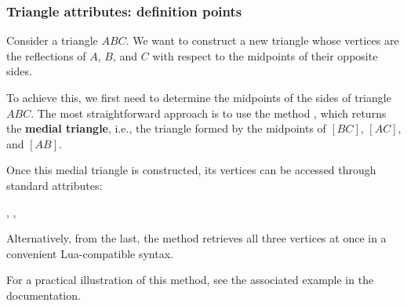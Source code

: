 \subsubsection{Triangle attributes: definition points} %
\label{ssub:triangle_attributes_points}

Consider a triangle $ABC$. We want to construct a new triangle whose vertices are the reflections of $A$, $B$, and $C$ with respect to the midpoints of their opposite sides.

\medskip
\noindent
To achieve this, we first need to determine the midpoints of the sides of triangle $ABC$. The most straightforward approach is to use the method , which returns the \textbf{medial triangle}, i.e., the triangle formed by the midpoints of $[BC]$, $[AC]$, and $[AB]$.

\medskip
\noindent
Once this medial triangle is constructed, its vertices can be accessed through standard attributes:
\begin{center}
, , 
\end{center}

\noindent
Alternatively, from the last, the method  retrieves all three vertices at once in a convenient Lua-compatible syntax.

\medskip
\noindent
For a practical illustration of this method, see  the associated  example in the documentation.

\vspace{1em}


\begin{minipage}{.5\textwidth-2cm}
\begin{center}
\end{center}
\end{minipage}
\begin{minipage}{.5\textwidth}
\begin{tkzexample}
\end{tkzexample}
\end{minipage}

